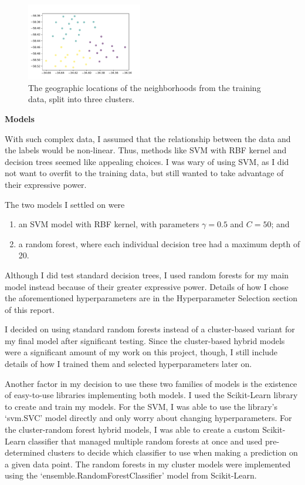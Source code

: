 \documentclass{ws-ijprai}
\newcommand{\subheader}[1]{\bigskip\begin{center}\textbf{#1}\end{center}}
\begin{document}
\begin{figure}[H]
  \centering
  \includegraphics[width=0.45\textwidth]{img/clusters/nhoods.pdf}
  \caption{The geographic locations of the neighborhoods from the training data, split into three clusters.}
  \label{fig:nhoods}
\end{figure}

\subheader{Models}

With such complex data, I assumed that the relationship between the data and the labels would be non-linear. Thus, methods like SVM with RBF kernel and decision trees seemed like appealing choices. I was wary of using SVM, as I did not want to overfit to the training data, but still wanted to take advantage of their expressive power.

The two models I settled on were
\begin{enumerate}
	\item an SVM model with RBF kernel, with parameters $\gamma=0.5$ and $C=50$; and
	\item a random forest, where each individual decision tree had a maximum depth of 20.
\end{enumerate}

Although I did test standard decision trees, I used random forests for my main model instead because of their greater expressive power. Details of how I chose the aforementioned hyperparameters are in the Hyperparameter Selection section of this report.

I decided on using standard random forests instead of a cluster-based variant for my final model after significant testing. Since the cluster-based hybrid models were a significant amount of my work on this project, though, I still include details of how I trained them and selected hyperparameters later on.

Another factor in my decision to use these two families of models is the existence of easy-to-use libraries implementing both models. I used the Scikit-Learn library to create and train my models. For the SVM, I was able to use the library's `svm.SVC' model directly and only worry about changing hyperparameters. For the cluster-random forest hybrid models, I was able to create a custom Scikit-Learn classifier that managed multiple random forests at once and used pre-determined clusters to decide which classifier to use when making a prediction on a given data point. The random forests in my cluster models were implemented using the `ensemble.RandomForestClassifier' model from Scikit-Learn.\cite{scikit-learn}
\end{document}
